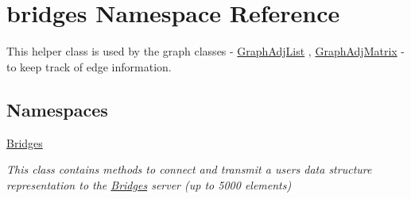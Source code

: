 \hypertarget{namespacebridges}{}\section{bridges Namespace Reference}
\label{namespacebridges}


This helper class is used by the graph classes -\/ \hyperlink{classbridges_1_1_graph_adj_list}{Graph\+Adj\+List} , \hyperlink{classbridges_1_1_graph_adj_matrix}{Graph\+Adj\+Matrix} -\/ to keep track of edge information.  


\subsection*{Namespaces}
\begin{DoxyCompactItemize}
\item 
 \hyperlink{namespacebridges_1_1_bridges}{Bridges}
\begin{DoxyCompactList}\small\item\em This class contains methods to connect and transmit a user\textquotesingle{}s data structure representation to the \hyperlink{namespacebridges_1_1_bridges}{Bridges} server (up to 5000 elements) \end{DoxyCompactList}\end{DoxyCompactItemize}
